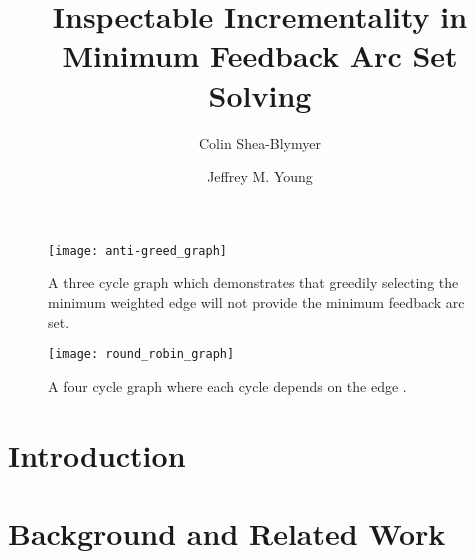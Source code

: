 \documentclass[sigconf]{acmart}
\begin{document}
\title{Inspectable Incrementality in Minimum Feedback Arc Set Solving}

\author{Colin Shea-Blymyer}
\author{Jeffrey M. Young}

\renewcommand{\shortauthors}{Shea-Blymyer and Young.}

\begin{abstract}
  
\end{abstract}


\begin{teaserfigure}
  \begin{subfigure}[t]{0.5\textwidth}
    \centering
    \texttt{[image: anti-greed\_graph]}
    \caption{A three cycle graph which demonstrates that greedily selecting the
      minimum weighted edge will not provide the minimum feedback arc set.}%
    \label{fig:three-cycle}
  \end{subfigure}%
  \hfill
  \begin{subfigure}[t]{0.5\textwidth}
    \centering
    \texttt{[image: round\_robin\_graph]}
    \caption{A four cycle graph where each cycle depends on the edge .}
    \label{fig:tournament-graph}
  \end{subfigure}
\end{teaserfigure}

\maketitle


\section{Introduction}

%
\section{Background and Related Work}

%
\end{document}
